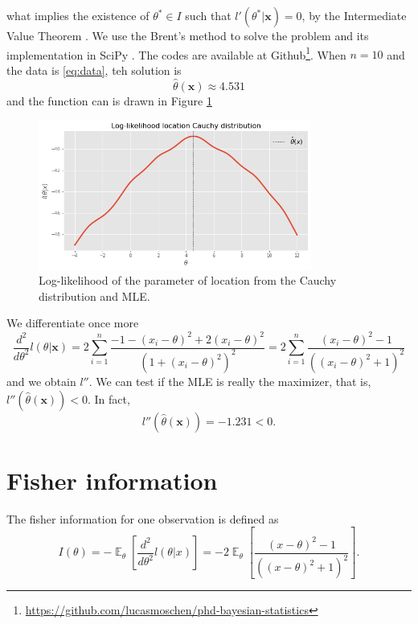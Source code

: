 \documentclass[a4paper,10pt, notitlepage]{report}
\theoremstyle{plain}
\newcommand{\ev}{\operatorname{\mathbb{E}}}
\newcommand{\bx}{\boldsymbol{x}} %
\begin{document}
    what implies the existence of $\theta^* \in I$ such that $l'(\theta^*|\bx)
    = 0$, by the Intermediate Value Theorem \cite[Theorem 12, Page 184]{Lages1976}. We use the Brent’s method \cite{brent} to solve the problem and its
    implementation in SciPy \cite{2020SciPy-NMeth}. The codes are available at
    Github\footnote{\url{https://github.com/lucasmoschen/phd-bayesian-statistics}}\cite{github}. When $n=10$ and the data is \ref{eq:data}, teh solution is
    $$
    \hat{\theta}(\bx) \approx 4.531
    $$
    and the function can is drawn in Figure \ref{fig:log-likelihood-cauchy}
    \begin{figure}[!hb]
        \centering
        \includegraphics[width=0.8\textwidth]{../../images/log-likelihood.png}
        \caption{Log-likelihood of the parameter of location from the Cauchy distribution and MLE.}
        \label{fig:log-likelihood-cauchy}
    \end{figure}
    
    
    We differentiate once more 
    \begin{equation}
        \label{eq:dderivarive-log-cauchy}
        \frac{d^2}{d\theta^2}l(\theta|\bx) = 2\sum_{i=1}^{n} \frac{- 1 - (x_i - \theta)^2 + 2(x_i-\theta)^2}{(1 + (x_i - \theta)^2)^2} = 2\sum_{i=1}^{n} \frac{(x_i - \theta)^2-1}{( (x_i - \theta)^2+1)^2}
    \end{equation}
    and we obtain $l''$. We can test if the MLE is really the maximizer, that is,
    $l''\left(\hat{\theta}(\bx)\right) < 0$. In fact,
    $$
    l''\left(\hat{\theta}(\bx)\right) = -1.231 < 0.
    $$

\section*{Fisher information}

The fisher information for one observation is defined as
\begin{equation}
    \label{eq:fisher-info}
    I(\theta) = -\ev_{\theta}\left[\frac{d^2}{d\theta^2}l(\theta|x)\right] = -2\ev_{\theta}\left[\frac{(x - \theta)^2 - 1}{((x - \theta)^2 + 1)^2}\right].
\end{equation}
\end{document}

